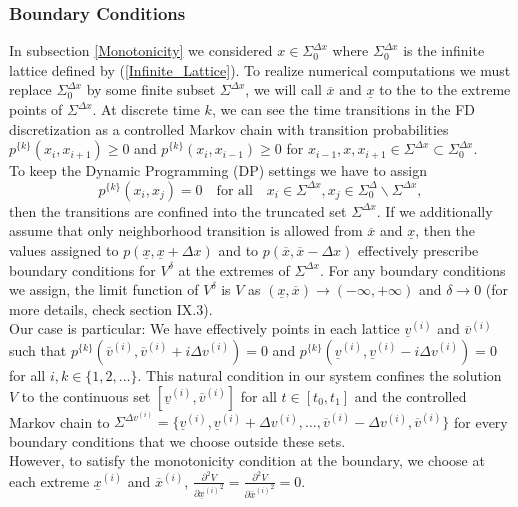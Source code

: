\subsubsection{Boundary Conditions} \label{Subsection_BC}

In subsection \ref{Monotonicity} we considered $x\in\Sigma_0^{\Delta x}$ where $\Sigma_0^{\Delta x}$ is the infinite lattice defined by (\ref{Infinite_Lattice}). To realize numerical computations we must replace $\Sigma^{\Delta x}_0$ by some finite subset $\Sigma^{\Delta x}$, we will call $\overline{x}$ and $\underline{x}$ to the to the extreme points of $\Sigma^{\Delta x}$. At discrete time $k$, we can see the time transitions in the FD discretization as a controlled Markov chain with transition probabilities $p^{\{k\}}(x_i,x_{i+1})\geq0$ and $p^{\{k\}}(x_i,x_{i-1})\geq0$ for $x_{i-1},x,x_{i+1}\in\Sigma^{\Delta x}\subset\Sigma^{\Delta x}_0$.\\
To keep the Dynamic Programming (DP) settings we have to assign
\begin{equation}
p^{\{k\}}(x_i,x_j)=0\quad\text{for all}\quad x_i\in\Sigma^{\Delta x},x_j\in\Sigma^{\Delta}_0\backslash\Sigma^{\Delta x},
\end{equation}
then the transitions are confined into the truncated set $\Sigma^{\Delta x}$. If we additionally assume that only neighborhood transition is allowed from $\overline{x}$ and $\underline{x}$, then the values assigned to $p(\underline{x},\underline{x}+\Delta x)$ and to $p(\overline{x},\overline{x}-\Delta x)$ effectively prescribe boundary conditions for $V^{\delta}$ at the extremes of $\Sigma^{\Delta x}$. For any boundary conditions we assign, the limit function of $V^{\delta}$ is $V$ as $(\underline{x},\overline{x})\to(-\infty,+\infty)$ and $\delta\to0$ (for more details, check \cite{fleming2006controlled} section IX.3).\\
Our case is particular: We have effectively points in each lattice $\underline{v}^{(i)}$ and $\overline{v}^{(i)}$ such that $p^{\{k\}}(\overline{v}^{(i)},\overline{v}^{(i)}+i\Delta v^{(i)})=0$ and $p^{\{k\}}(\underline{v}^{(i)},\underline{v}^{(i)}-i\Delta v^{(i)})=0$ for all $i,k\in\{1,2,\dots\}$. This natural condition in  our system confines the solution $V$ to the continuous set $[\underline{v}^{(i)},\overline{v}^{(i)}]$ for all $t\in[t_0,t_1]$ and the controlled Markov chain to $\Sigma^{\Delta v^{(i)}}=\{\underline{v}^{(i)},\underline{v}^{(i)}+\Delta v^{(i)},\dots,\overline{v}^{(i)}-\Delta v^{(i)},\overline{v}^{(i)}\}$ for every boundary conditions that we choose outside these sets.\\
However, to satisfy the monotonicity condition at the boundary, we choose at each extreme $\underline{x}^{(i)}$ and $\overline{x}^{(i)}$, $\frac{\partial^2V}{\partial{\underline{x}^{(i)}}^2}=\frac{\partial^2V}{\partial{\overline{x}^{(i)}}^2}=0$.

